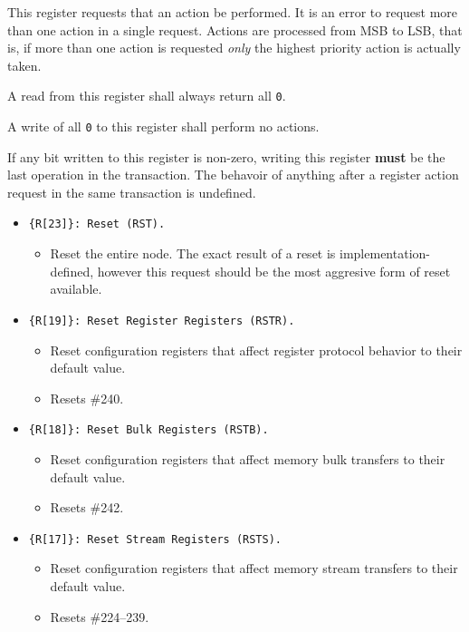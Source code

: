 This register requests that an action be performed. It is an error to request
more than one action in a single request. Actions are processed from MSB to
LSB, that is, if more than one action is requested {\em only} the highest
priority action is actually taken.

A read from this register shall always return all {\tt 0}.

A write of all {\tt 0} to this register shall perform no actions.

If any bit written to this register is non-zero, writing this register {\bf
must} be the last operation in the transaction. The behavoir of anything after
a register action request in the same transaction is undefined.

\begin{itemize}
  \item \texttt{\{R[23]\}: Reset (RST).}
    \begin{itemize}
      \item Reset the entire node. The exact result of a reset is
        implementation-defined, however this request should be the most
        aggresive form of reset available.
    \end{itemize}
  \item \texttt{\{R[19]\}: Reset Register Registers (RSTR).}
    \begin{itemize}
      \item Reset \proto configuration registers that affect register protocol
        behavior to their default value.
      \item Resets \#240.
    \end{itemize}
  \item \texttt{\{R[18]\}: Reset Bulk Registers (RSTB).}
    \begin{itemize}
      \item Reset \proto configuration registers that affect memory bulk
        transfers to their default value.
      \item Resets \#242.
    \end{itemize}
  \item \texttt{\{R[17]\}: Reset Stream Registers (RSTS).}
    \begin{itemize}
      \item Reset \proto configuration registers that affect memory stream
        transfers to their default value.
      \item Resets \#224--239.
    \end{itemize}
\end{itemize}

